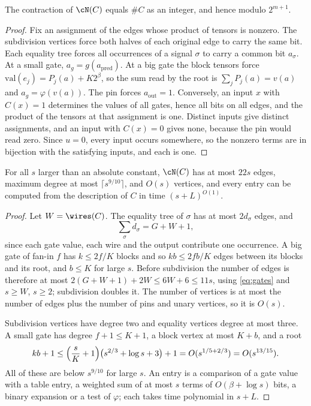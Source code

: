 \begin{lemma}[Correctness]\label{lem:correct}
The contraction of $\cN(C)$ equals $\#C$ as an integer, and hence modulo
$2^{m+1}$.
\end{lemma}

\begin{proof}
Fix an assignment of the edges whose product of tensors is nonzero. The
subdivision vertices force both halves of each original edge to carry the same
bit. Each equality tree forces all occurrences of a signal $\sigma$ to carry a
common bit $a_\sigma$. At a small gate, $a_g=g(a_{\mathrm{pred}})$. At a big gate
the block tensors force $\mathrm{val}(e_j)=P_j(a)+K2^\beta$, so the sum read by
the root is $\sum_jP_j(a)=v(a)$ and $a_g=\varphi(v(a))$. The pin forces
$a_{\mathrm{out}}=1$. Conversely, an input $x$ with $C(x)=1$ determines the values
of all gates, hence all bits on all edges, and the product of the tensors at
that assignment is one. Distinct inputs give distinct assignments, and an input
with $C(x)=0$ gives none, because the pin would read zero. Since $u=0$, every
input occurs somewhere, so the nonzero terms are in bijection with the
satisfying inputs, and each is one.
\end{proof}

\begin{lemma}[Size]\label{lem:size}
For all $s$ larger than an absolute constant, $\cN(C)$ has at most $22s$ edges,
maximum degree at most $\lceil s^{9/10}\rceil$, and $O(s)$ vertices, and every
entry can be computed from the description of $C$ in time $(s+L)^{O(1)}$.
\end{lemma}

\begin{proof}
Let $W=\wires(C)$. The equality tree of $\sigma$ has at most $2d_\sigma$ edges, and
\[
\sum_\sigma d_\sigma=G+W+1,
\]
since each gate value, each wire and the output contribute one occurrence. A big
gate of fan-in $f$ has $k\le2f/K$ blocks and so $kb\le2fb/K$ edges between its
blocks and its root, and $b\le K$ for large $s$. Before subdivision the number
of edges is therefore at most $2(G+W+1)+2W\le6W+6\le11s$, using
\eqref{eq:gates} and $s\ge W$, $s\ge2$; subdivision doubles it. The number of
vertices is at most the number of edges plus the number of pins and unary
vertices, so it is $O(s)$.

Subdivision vertices have degree two and equality vertices degree at most
three. A small gate has degree $f+1\le K+1$, a block vertex at most $K+b$, and a
root
\[
kb+1\le\Bigl(\frac{s}{K}+1\Bigr)\bigl(s^{2/3}+\log s+3\bigr)+1=O(s^{1/5+2/3})=O(s^{13/15}).
\]
All of these are below $s^{9/10}$ for large $s$. An entry is a comparison of a
gate value with a table entry, a weighted sum of at most $s$ terms of $O(\beta+
\log s)$ bits, a binary expansion or a test of $\varphi$; each takes time
polynomial in $s+L$.
\end{proof}

